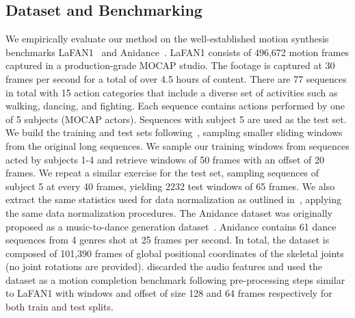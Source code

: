 \documentclass[letterpaper]{article} \usepackage[]{aaai23}  \usepackage{times}  \usepackage{helvet}  \usepackage{courier}  \usepackage[hyphens]{url}  \usepackage{graphicx} \urlstyle{rm} \def\UrlFont{\rm}  \usepackage{natbib}  \usepackage{caption} \frenchspacing  \setlength{\pdfpagewidth}{8.5in} \setlength{\pdfpageheight}{11in}
\begin{document}
\subsection{Dataset and Benchmarking} 
We empirically evaluate our method on the well-established motion synthesis benchmarks LaFAN1~\cite{harvey2020robust} and Anidance~\cite{tang2018}. LaFAN1 consists of 496,672 motion frames captured in a production-grade MOCAP studio. The footage is captured at 30 frames per second for a total of over 4.5 hours of content. There are 77 sequences in total with 15 action categories that include a diverse set of activities such as walking, dancing, and fighting. Each sequence contains actions performed by one of 5 subjects (MOCAP actors). Sequences with subject 5 are used as the test set. We build the training and test sets following~\citet{harvey2020robust}, sampling smaller sliding windows from the original long sequences. We sample our training windows from sequences acted by subjects 1-4 and retrieve windows of 50 frames with an offset of 20 frames. We repeat a similar exercise for the test set, sampling sequences of subject 5 at every 40 frames, yielding 2232 test windows of 65 frames. We also extract the same statistics used for data normalization as outlined in~\citep{harvey2020robust}, applying the same data normalization procedures. 
The Anidance dataset was originally proposed as a music-to-dance generation dataset~\citep{tang2018}. Anidance contains 61 dance sequences from 4 genres shot at 25 frames per second. In total, the dataset is composed of 101,390 frames of global positional coordinates of the skeletal joints (no joint rotations are provided). \citet{duan2021singleshot} discarded the audio features and used the dataset as a motion completion benchmark following pre-processing steps similar to LaFAN1 with windows and offset of size 128 and 64 frames respectively for both train and test splits. 
\end{document}
